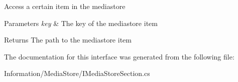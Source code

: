 Access a certain item in the mediastore 


\begin{DoxyParams}{Parameters}
{\em key} & The key of the mediastore item\\
\hline
\end{DoxyParams}
\begin{DoxyReturn}{Returns}
The path to the mediastore item
\end{DoxyReturn}


The documentation for this interface was generated from the following file\+:\begin{DoxyCompactItemize}
\item 
Information/\+Media\+Store/I\+Media\+Store\+Section.\+cs\end{DoxyCompactItemize}
